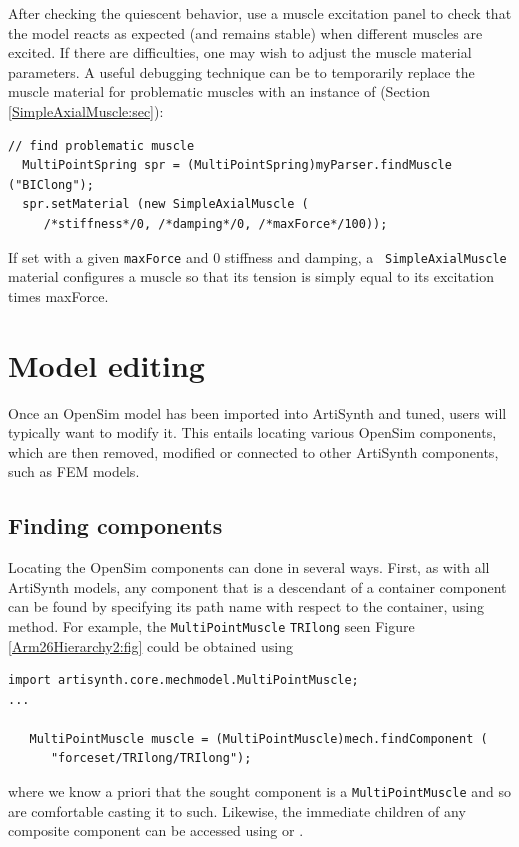 \begin{itemize}
After checking the quiescent behavior, use a muscle excitation panel to check
that the model reacts as expected (and remains stable) when different muscles
are excited. If there are difficulties, one may wish to adjust the muscle
material parameters. A useful debugging technique can be to temporarily replace
the muscle material for problematic muscles with an instance of
 (Section \ref{SimpleAxialMuscle:sec}):
%
\begin{lstlisting}[]
  // find problematic muscle
  MultiPointSpring spr = (MultiPointSpring)myParser.findMuscle ("BIClong");
  spr.setMaterial (new SimpleAxialMuscle (
     /*stiffness*/0, /*damping*/0, /*maxForce*/100));
\end{lstlisting}
%
If set with a given {\tt maxForce} and 0 stiffness and damping, a {\tt
SimpleAxialMuscle} material configures a muscle so that its tension is simply
equal to its {\sf excitation} times {\sf maxForce}.

\end{itemize}

\section{Model editing}
\label{OpenSimModelEditing:sec}

Once an OpenSim model has been imported into ArtiSynth and tuned, users will
typically want to modify it. This entails locating various OpenSim components,
which are then removed, modified or connected to other ArtiSynth components,
such as FEM models.

\subsection{Finding components}
\label{OpenSimFindingComponents:sec}

Locating the OpenSim components can done in several ways.  First, as with all
ArtiSynth models, any component that is a descendant of a container component
can be found by specifying its path name with respect to the container, using
 method. For example,
the {\tt MultiPointMuscle} {\tt TRIlong} seen Figure \ref{Arm26Hierarchy2:fig}
could be obtained using
%
\begin{lstlisting}[]
import artisynth.core.mechmodel.MultiPointMuscle;
...

   MultiPointMuscle muscle = (MultiPointMuscle)mech.findComponent (
      "forceset/TRIlong/TRIlong");
\end{lstlisting}
%
where we know a priori that the sought component is a {\tt MultiPointMuscle} and
so are comfortable casting it to such. Likewise, the immediate children
of any composite component can be accessed using 
 or
.

